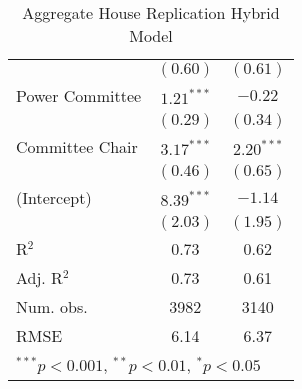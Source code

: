 \documentclass[12pt]{article}
\begin{document}
\begin{table}
\begin{center}
\begin{tabular}{l c c }
			& $(0.60)$      & $(0.61)$      \\
			Power Committee                     & $1.21^{***}$  & $-0.22$       \\
			& $(0.29)$      & $(0.34)$      \\
			Committee Chair                     & $3.17^{***}$  & $2.20^{***}$  \\
			& $(0.46)$      & $(0.65)$      \\
			(Intercept)                 & $8.39^{***}$  & $-1.14$       \\
			& $(2.03)$      & $(1.95)$      \\
			\hline
			R$^2$                       & 0.73          & 0.62          \\
			Adj. R$^2$                  & 0.73          & 0.61          \\
			Num. obs.                   & 3982          & 3140          \\
			RMSE                        & 6.14          & 6.37          \\
			\hline
			\multicolumn{3}{l}{\scriptsize{$^{***}p<0.001$, $^{**}p<0.01$, $^*p<0.05$}}
		\end{tabular}
		\caption{Aggregate House Replication Hybrid Model}
		\label{table:coefficients}
	\end{center}
\end{table}
	
\end{document}
